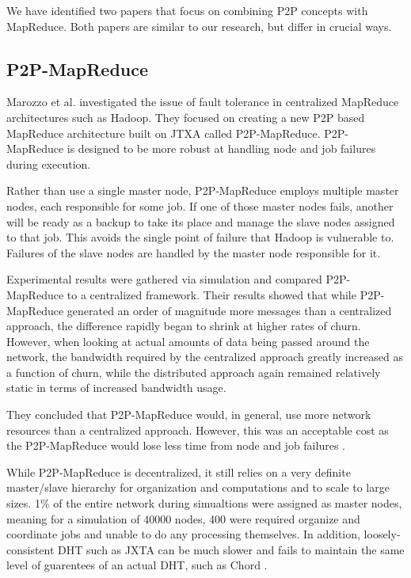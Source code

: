 \documentclass[10pt, conference, compsocconf]{IEEEtran}
\begin{document}
We have identified two papers that focus on combining P2P concepts with MapReduce.  Both papers are similar to our research, but differ in crucial ways.

\subsection{P2P-MapReduce}
Marozzo et al. \cite{marozzo2012p2p} investigated the issue of fault tolerance in centralized MapReduce architectures such as Hadoop.  They focused on creating a new P2P based MapReduce architecture built on JTXA \cite{935182} called P2P-MapReduce.  P2P-MapReduce is designed to be more robust at handling node and job failures during execution.

Rather than use a single master node, P2P-MapReduce employs multiple master nodes, each responsible for some job.  If one of those master nodes fails, another will be ready as a backup to take its place and manage the slave nodes assigned to that job.  This avoids the single point of failure that Hadoop is vulnerable to. Failures of the slave nodes are handled by the master node responsible for it.

Experimental results were gathered via simulation and compared P2P-MapReduce to a centralized framework. Their results showed that while P2P-MapReduce generated an order of magnitude more messages than a centralized approach, the difference rapidly began to shrink at higher rates of churn.  However, when looking at actual amounts of data being passed around the network, the bandwidth required by the centralized approach greatly increased as a function of churn, while the distributed approach again remained relatively static in terms of increased bandwidth usage.  

They concluded that P2P-MapReduce would, in general, use more network resources than a centralized approach. However, this was an acceptable cost as the P2P-MapReduce would lose less time from node and job failures \cite{marozzo2012p2p}.

While P2P-MapReduce is decentralized, it still relies on a very definite master/slave hierarchy for organization and computations and to scale to large sizes.  1\% of the entire network during simualtions were assigned as master nodes, meaning for a simulation of 40000 nodes, 400 were required organize and coordinate jobs and unable to do any processing themselves.  In addition, loosely-consistent DHT such as JXTA can be much slower and fails to maintain the same level of guarentees of an actual DHT, such as Chord \cite{5359174}.   %
\end{document}
